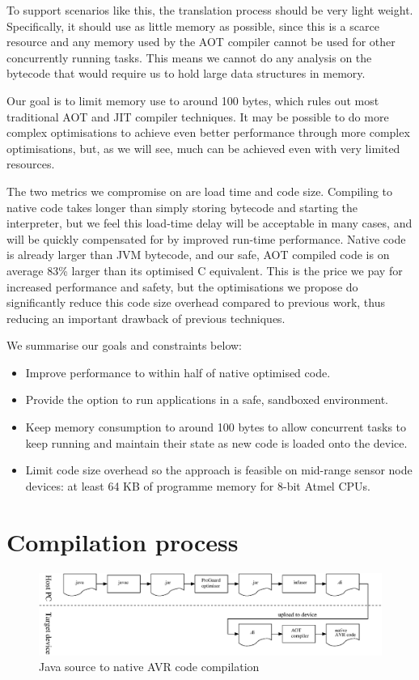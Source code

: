 To support scenarios like this, the translation process should be very light weight. Specifically, it should use as little memory as possible, since this is a scarce resource and any memory used by the AOT compiler cannot be used for other concurrently running tasks. This means we cannot do any analysis on the bytecode that would require us to hold large data structures in memory.

Our goal is to limit memory use to around 100 bytes, which rules out most traditional AOT and JIT compiler techniques. It may be possible to do more complex optimisations to achieve even better performance through more complex optimisations, but, as we will see, much can be achieved even with very limited resources.

The two metrics we compromise on are load time and code size. Compiling to native code takes longer than simply storing bytecode and starting the interpreter, but we feel this load-time delay will be acceptable in many cases, and will be quickly compensated for by improved run-time performance. Native code is already larger than JVM bytecode, and our safe, AOT compiled code is on average 83\% larger than its optimised C equivalent. This is the price we pay for increased performance and safety, but the optimisations we propose do significantly reduce this code size overhead compared to previous work, thus reducing an important drawback of previous techniques.

We summarise our goals and constraints below:
\begin{itemize}
  \item Improve performance to within half of native optimised code.
  \item Provide the option to run applications in a safe, sandboxed environment.
  \item Keep memory consumption to around 100 bytes to allow concurrent tasks to keep running and maintain their state as new code is loaded onto the device.
  \item Limit code size overhead so the approach is feasible on mid-range sensor node devices: at least 64 KB of programme memory for 8-bit Atmel CPUs.
\end{itemize}

\section{Compilation process}
\label{sec-compilation-process}

\begin{figure}
\includegraphics[width=\linewidth]{compilation-process.eps}
\caption{Java source to native AVR code compilation}
\label{fig-translation-process}
\end{figure}

